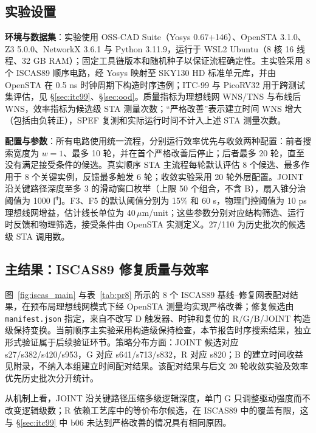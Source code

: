 \documentclass[twocolumn,10pt,fontset=windows]{ctexart}
\begin{document}
\subsection{实验设置}\label{sec:setup}

\textbf{环境与数据集}：实验使用 OSS-CAD Suite（Yosys 0.67+146）、OpenSTA 3.1.0\cite{opensta}、Z3 5.0.0\cite{z3}、NetworkX 3.6.1\cite{networkx} 与 Python 3.11.9，运行于 WSL2 Ubuntu（8 核 16 线程、32 GB RAM）；固定工具链版本和随机种子以保证流程确定性。主实验采用 8 个 ISCAS89 顺序电路，经 Yosys 映射至 SKY130 HD 标准单元库，并由 OpenSTA 在 0.5 ns 时钟周期下构造时序违例；ITC-99 与 PicoRV32 用于跨测试集评估，见 \S\ref{sec:itc99}、\S\ref{sec:ood}。质量指标为理想线网 WNS/TNS 与布线后 WNS，效率指标为候选级 STA 测量次数；“严格改善”表示建立时间 WNS 增大（包括由负转正），SPEF 复测和实际运行时间不计入上述 STA 测量次数。

\textbf{配置与参数}：所有电路使用统一流程，分别运行效率优先与收敛两种配置：前者搜索宽度为 $w=1$、最多 10 轮，并在首个严格改善后停止；后者最多 20 轮，直至没有满足接受条件的候选。真实顺序 STA 主流程每轮默认评估 8 个候选、最多作用于 8 个关键实例，反馈最多触发 6 轮；收敛实验采用 20 轮外层配置。JOINT 沿关键路径深度至多 3 的滑动窗口枚举（上限 50 个组合，不含 B），扇入锥分治阈值为 1000 门。F3、F5 的默认阈值分别为 15\% 和 60 s，物理门控阈值为 10 ps 理想线网增益，估计线长单位为 40\,$\mu$m/unit；这些参数分别对应结构筛选、运行时反馈和物理筛选，接受条件由 OpenSTA 实测定义。27/110 为历史批次的候选级 STA 调用数。

\subsection{主结果：ISCAS89 修复质量与效率}\label{sec:iscas}

图~\ref{fig:iscas_main} 与表~\ref{tab:pr8} 所示的 8 个 ISCAS89 基线--修复网表配对结果，在预布局理想线网模式下经 OpenSTA 测量均实现严格改善；修复候选由 \texttt{manifest.json} 指定，来自不改写 D 触发器、时钟和复位的 R/G/B/JOINT 构造级保持变换。当前顺序主实验采用构造级保持检查，本节报告时序搜索结果，独立形式验证属于后续验证环节。策略分布方面：JOINT 候选对应 s27/s382/s420/s953，G 对应 s641/s713/s832，R 对应 s820；B 的建立时间收益见附录，不纳入本组建立时间配对结果。该配对结果与后文 20 轮收敛实验及效率优先历史批次分开统计。

从机制上看，JOINT 沿关键路径压缩多级逻辑深度，单门 G 只调整驱动强度而不改变逻辑级数；R 依赖工艺库中的等价布尔候选，在 ISCAS89 中的覆盖有限，这与 \S\ref{sec:itc99} 中 b06 未达到严格改善的情况具有相同原因。
\end{document}
